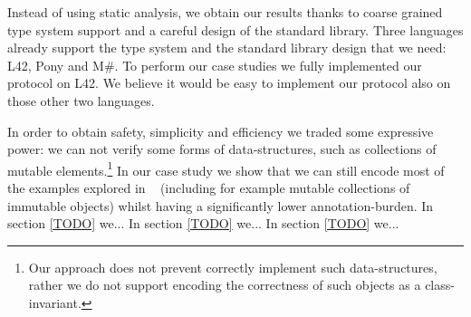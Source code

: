 Instead of using static analysis,
we obtain our results thanks to coarse grained type system support and a careful design of the standard library. Three languages already support the type system and the standard library design that we need:
L42, Pony and M\#. To perform our case studies we fully implemented our protocol on L42.
We believe it would be easy to implement our protocol also on those other two languages.

In order to obtain safety, simplicity and efficiency we traded some expressive power:
we can not verify some forms of data-structures, such as collections of mutable elements.\footnote{Our approach does not prevent correctly implement such data-structures, rather we do not support encoding the correctness of such objects as a class-invariant.}
In our case study we show that
we can still encode most of the examples explored in ~\cite{???} (including for example mutable collections of immutable objects) whilst having a significantly lower annotation-burden.
In section \ref{TODO} we...
In section \ref{TODO} we...
In section \ref{TODO} we...

